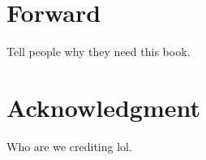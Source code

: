 \chapter*{Forward}

Tell people why they need this book.

\chapter*{Acknowledgment}

Who are we crediting lol.